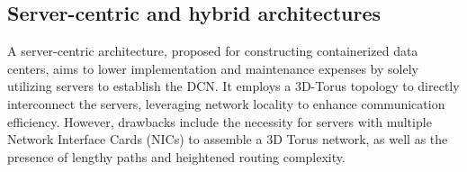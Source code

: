 \subsection{Server-centric and hybrid architectures}
A server-centric architecture, proposed for constructing containerized data centers, aims to lower implementation and maintenance expenses by solely utilizing servers to establish the DCN.\@ 
It employs a 3D-Torus topology to directly interconnect the servers, leveraging network locality to enhance communication efficiency. 
However, drawbacks include the necessity for servers with multiple Network Interface Cards (NICs) to assemble a 3D Torus network, as well as the presence of lengthy paths and heightened routing complexity.